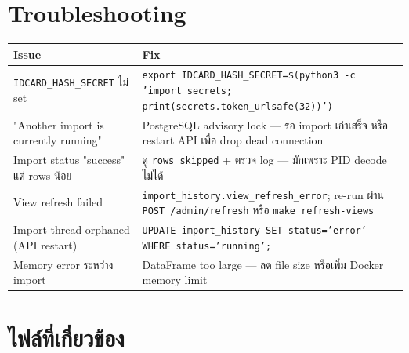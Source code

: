 \documentclass[11pt,a4paper]{article}
\begin{document}
\section{Troubleshooting}

\begin{center}
\footnotesize
\begin{tabularx}{\linewidth}{L{5cm} X}
\toprule
\textbf{Issue} & \textbf{Fix} \\
\midrule
\texttt{IDCARD\_HASH\_SECRET} ไม่ set
    & \texttt{export IDCARD\_HASH\_SECRET=\$(python3 -c 'import secrets; print(secrets.token\_urlsafe(32))')} \\
\addlinespace
"Another import is currently running"
    & PostgreSQL advisory lock --- รอ import เก่าเสร็จ หรือ restart API เพื่อ drop dead connection \\
\addlinespace
Import status "success" แต่ rows น้อย
    & ดู \texttt{rows\_skipped} + ตรวจ log --- มักเพราะ PID decode ไม่ได้ \\
\addlinespace
View refresh failed
    & \texttt{import\_history.view\_refresh\_error};
      re-run ผ่าน \texttt{POST /admin/refresh} หรือ \texttt{make refresh-views} \\
\addlinespace
Import thread orphaned (API restart)
    & \texttt{UPDATE import\_history SET status='error' WHERE status='running';} \\
\addlinespace
Memory error ระหว่าง import
    & DataFrame too large --- ลด file size หรือเพิ่ม Docker memory limit \\
\bottomrule
\end{tabularx}
\end{center}

\section{ไฟล์ที่เกี่ยวข้อง}
\end{document}
